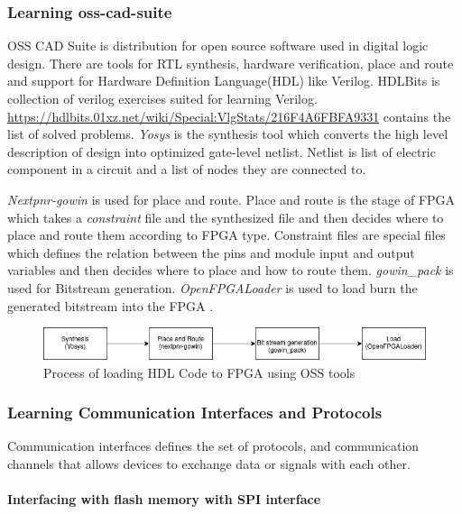 \documentclass[a4paper,12pt]{article}
\begin{document}
    \subsubsection{Learning oss-cad-suite}
    OSS CAD Suite is distribution for open source software used in digital logic design.
    There are tools for RTL synthesis, hardware verification, place and route and support for Hardware Definition Language(HDL) like Verilog. HDLBits is collection of verilog exercises suited for learning Verilog. \url{https://hdlbits.01xz.net/wiki/Special:VlgStats/216F4A6FBFA9331} contains the list of solved problems. \textit{Yosys} is the synthesis tool which converts the high level description of design into optimized gate-level netlist. Netlist is list of electric component in a circuit and a list of nodes they are connected to.
    
    \textit{Nextpnr-gowin} is used for place and route. Place and route is the stage of FPGA which takes a \textit{constraint} file and the synthesized file and then decides where to place and route them according to FPGA type. Constraint files are special files which defines the relation between the pins and module input and output variables and then decides where to place and how to route them. \textit{gowin\_pack} is used for Bitstream generation. \textit{OpenFPGALoader} is used to load burn the generated bitstream into the FPGA .
    
    \begin{figure}[H]
        \centering
        \includegraphics[width=1\textwidth]{./images/oss-process.jpeg}
        \caption{Process of loading HDL Code to FPGA using OSS tools}
    \end{figure}

    \subsubsection{Learning Communication Interfaces and Protocols}
    Communication interfaces defines the set of protocols, and communication channels that allows devices to exchange data or signals with each other. 

    \paragraph{Interfacing with flash memory with SPI interface}
    
\end{document}
